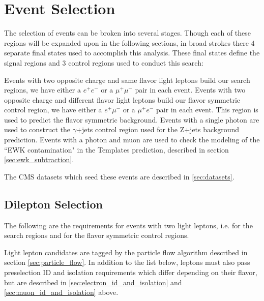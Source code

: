 \section{Event Selection}

  The selection of events can be broken into several stages. Though each of these regions will be expanded upon in the following sections, in broad strokes there 4 separate final states used to accomplish this analysis. These final states define the signal regions and 3 control regions used to conduct this search:

  \begin{description}
     Events with two opposite charge and same flavor light leptons build our search regions, we have either a $e^+e^-$ or a $\mu^+ \mu^-$ pair in each event.
     Events with two opposite charge and different flavor light leptons build our flavor symmetric control region, we have either a $e^+\mu^-$ or a $\mu^+ e^-$ pair in each event. This region is used to predict the flavor symmetric background.
     Events with a single photon are used to construct the $\gamma$+jets control region used for the Z+jets background prediction. 
     Events with a photon and muon are used to check the modeling of the ``EWK contamination" in the \MET Templates prediction, described in section \ref{sec:ewk_subtraction}.
  \end{description}

  The CMS datasets which seed these events are described in \ref{sec:datasets}.
  
  \subsection{Dilepton Selection} \label{sec:dilepton_selection}

    The following are the requirements for events with two light leptons, i.e. for the search regions and for the flavor symmetric control regions.  

    Light lepton candidates are tagged by the particle flow algorithm described in section \ref{sec:particle_flow}. In addition to the list below, leptons must also pass preselection ID and isolation requirements which differ depending on their flavor, but are described in \ref{sec:electron_id_and_isolation} and \ref{sec:muon_id_and_isolation} above.

